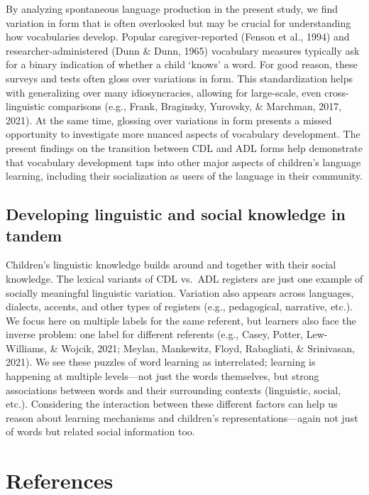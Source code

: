 \documentclass[10pt, letterpaper]{article}
\begin{document}
By analyzing spontaneous language production in the present study, we
find variation in form that is often overlooked but may be crucial for
understanding how vocabularies develop. Popular caregiver-reported
(Fenson et al., 1994) and researcher-administered (Dunn \& Dunn, 1965)
vocabulary measures typically ask for a binary indication of whether a
child `knows' a word. For good reason, these surveys and tests often
gloss over variations in form. This standardization helps with
generalizing over many idiosyncracies, allowing for large-scale, even
cross-linguistic comparisons (e.g., Frank, Braginsky, Yurovsky, \&
Marchman, 2017, 2021). At the same time, glossing over variations in
form presents a missed opportunity to investigate more nuanced aspects
of vocabulary development. The present findings on the transition
between CDL and ADL forms help demonstrate that vocabulary development
taps into other major aspects of children's language learning, including
their socialization as users of the language in their community.

\hypertarget{developing-linguistic-and-social-knowledge-in-tandem}{%
\subsection{Developing linguistic and social knowledge in
tandem}\label{developing-linguistic-and-social-knowledge-in-tandem}}

Children's linguistic knowledge builds around and together with their
social knowledge. The lexical variants of CDL vs.~ADL registers are just
one example of socially meaningful linguistic variation. Variation also
appears across languages, dialects, accents, and other types of
registers (e.g., pedagogical, narrative, etc.). We focus here on
multiple labels for the same referent, but learners also face the
inverse problem: one label for different referents (e.g., Casey, Potter,
Lew-Williams, \& Wojcik, 2021; Meylan, Mankewitz, Floyd, Rabagliati, \&
Srinivasan, 2021). We see these puzzles of word learning as
interrelated; learning is happening at multiple levels---not just the
words themselves, but strong associations between words and their
surrounding contexts (linguistic, social, etc.). Considering the
interaction between these different factors can help us reason about
learning mechanisms and children's representations---again not just of
words but related social information too.

\hypertarget{references}{%
\section{References}\label{references}}
\end{document}
